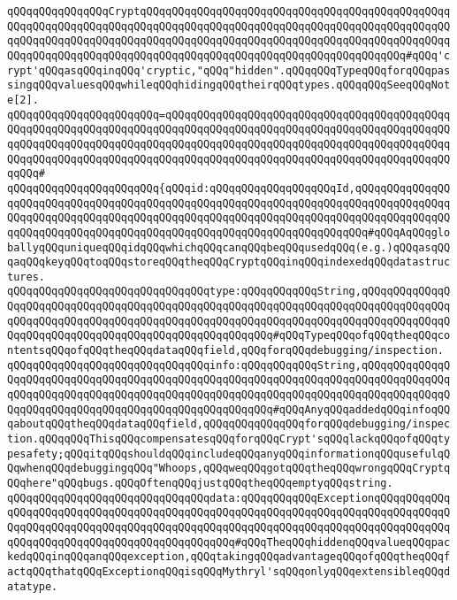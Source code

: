 \verb|qQQqqQQqqQQqqQQqCryptqQQqqQQqqQQqqQQqqQQqqQQqqQQqqQQqqQQqqQQqqQQqqQQqqQQqqQQqqQQqqQQqqQQqqQQqqQQqqQQqqQQqqQQqqQQqqQQqqQQqqQQqqQQqqQQqqQQqqQQqqQQqqQQqqQQqqQQqqQQqqQQqqQQqqQQqqQQqqQQqqQQqqQQqqQQqqQQqqQQqqQQqqQQqqQQqqQQqqQQqqQQqqQQqqQQqqQQqqQQqqQQqqQQqqQQqqQQqqQQqqQQqqQQqqQQq#qQQq'crypt'qQQqasqQQqinqQQq'cryptic,"qQQq"hidden".qQQqqQQqTypeqQQqforqQQqpassingqQQqvaluesqQQqwhileqQQqhidingqQQqtheirqQQqtypes.qQQqqQQqSeeqQQqNote[2].|\newline
\verb|qQQqqQQqqQQqqQQqqQQqqQQq=qQQqqQQqqQQqqQQqqQQqqQQqqQQqqQQqqQQqqQQqqQQqqQQqqQQqqQQqqQQqqQQqqQQqqQQqqQQqqQQqqQQqqQQqqQQqqQQqqQQqqQQqqQQqqQQqqQQqqQQqqQQqqQQqqQQqqQQqqQQqqQQqqQQqqQQqqQQqqQQqqQQqqQQqqQQqqQQqqQQqqQQqqQQqqQQqqQQqqQQqqQQqqQQqqQQqqQQqqQQqqQQqqQQqqQQqqQQqqQQqqQQqqQQqqQQqqQQqqQQq#|\newline
\verb|qQQqqQQqqQQqqQQqqQQqqQQq{qQQqid:qQQqqQQqqQQqqQQqqQQqId,qQQqqQQqqQQqqQQqqQQqqQQqqQQqqQQqqQQqqQQqqQQqqQQqqQQqqQQqqQQqqQQqqQQqqQQqqQQqqQQqqQQqqQQqqQQqqQQqqQQqqQQqqQQqqQQqqQQqqQQqqQQqqQQqqQQqqQQqqQQqqQQqqQQqqQQqqQQqqQQqqQQqqQQqqQQqqQQqqQQqqQQqqQQqqQQqqQQqqQQqqQQqqQQqqQQq#qQQqAqQQqgloballyqQQquniqueqQQqidqQQqwhichqQQqcanqQQqbeqQQqusedqQQq(e.g.)qQQqasqQQqaqQQqkeyqQQqtoqQQqstoreqQQqtheqQQqCryptqQQqinqQQqindexedqQQqdatastructures.|\newline
\verb|qQQqqQQqqQQqqQQqqQQqqQQqqQQqqQQqtype:qQQqqQQqqQQqString,qQQqqQQqqQQqqQQqqQQqqQQqqQQqqQQqqQQqqQQqqQQqqQQqqQQqqQQqqQQqqQQqqQQqqQQqqQQqqQQqqQQqqQQqqQQqqQQqqQQqqQQqqQQqqQQqqQQqqQQqqQQqqQQqqQQqqQQqqQQqqQQqqQQqqQQqqQQqqQQqqQQqqQQqqQQqqQQqqQQqqQQqqQQqqQQqqQQq#qQQqTypeqQQqofqQQqtheqQQqcontentsqQQqofqQQqtheqQQqdataqQQqfield,qQQqforqQQqdebugging/inspection.|\newline
\verb|qQQqqQQqqQQqqQQqqQQqqQQqqQQqqQQqinfo:qQQqqQQqqQQqString,qQQqqQQqqQQqqQQqqQQqqQQqqQQqqQQqqQQqqQQqqQQqqQQqqQQqqQQqqQQqqQQqqQQqqQQqqQQqqQQqqQQqqQQqqQQqqQQqqQQqqQQqqQQqqQQqqQQqqQQqqQQqqQQqqQQqqQQqqQQqqQQqqQQqqQQqqQQqqQQqqQQqqQQqqQQqqQQqqQQqqQQqqQQqqQQqqQQq#qQQqAnyqQQqaddedqQQqinfoqQQqaboutqQQqtheqQQqdataqQQqfield,qQQqqQQqqQQqqQQqforqQQqdebugging/inspection.qQQqqQQqThisqQQqcompensatesqQQqforqQQqCrypt'sqQQqlackqQQqofqQQqtypesafety;qQQqitqQQqshouldqQQqincludeqQQqanyqQQqinformationqQQqusefulqQQqwhenqQQqdebuggingqQQq"Whoops,qQQqweqQQqgotqQQqtheqQQqwrongqQQqCryptqQQqhere"qQQqbugs.qQQqOftenqQQqjustqQQqtheqQQqemptyqQQqstring.|\newline
\verb|qQQqqQQqqQQqqQQqqQQqqQQqqQQqqQQqdata:qQQqqQQqqQQqExceptionqQQqqQQqqQQqqQQqqQQqqQQqqQQqqQQqqQQqqQQqqQQqqQQqqQQqqQQqqQQqqQQqqQQqqQQqqQQqqQQqqQQqqQQqqQQqqQQqqQQqqQQqqQQqqQQqqQQqqQQqqQQqqQQqqQQqqQQqqQQqqQQqqQQqqQQqqQQqqQQqqQQqqQQqqQQqqQQqqQQqqQQqqQQq#qQQqTheqQQqhiddenqQQqvalueqQQqpackedqQQqinqQQqanqQQqexception,qQQqtakingqQQqadvantageqQQqofqQQqtheqQQqfactqQQqthatqQQqExceptionqQQqisqQQqMythryl'sqQQqonlyqQQqextensibleqQQqdatatype.|\newline
